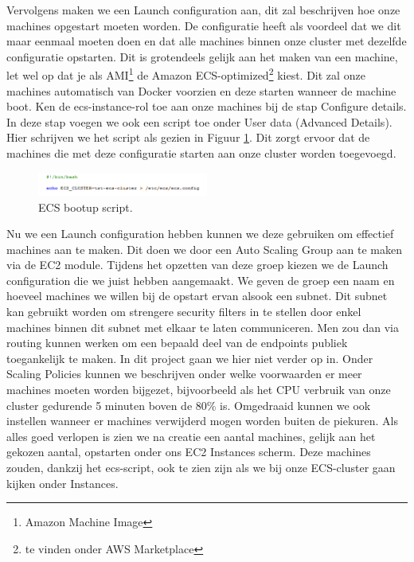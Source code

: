 \documentclass{article}
\begin{document}
	\par
	Vervolgens maken we een Launch configuration aan, dit zal beschrijven hoe onze machines opgestart moeten worden. De configuratie heeft als voordeel dat we dit maar eenmaal moeten doen en dat alle machines binnen onze cluster met dezelfde configuratie opstarten. Dit is grotendeels gelijk aan het maken van een machine, let wel op dat je als AMI\footnote{Amazon Machine Image} de Amazon ECS-optimized\footnote{te vinden onder AWS Marketplace} kiest. Dit zal onze machines automatisch van Docker voorzien en deze starten wanneer de machine boot. Ken de ecs-instance-rol toe aan onze machines bij de stap Configure details. In deze stap voegen we ook een script toe onder User data (Advanced Details). Hier schrijven we het script als gezien in Figuur \ref{fig:ecs-script}. Dit zorgt ervoor dat de machines die met deze configuratie starten aan onze cluster worden toegevoegd.
	\begin{figure}[h!]
		\centering
  		\includegraphics[width=0.5\textwidth]{images/ecs-script.PNG}
  		\caption{ECS bootup script.}
  		\label{fig:ecs-script}
	\end{figure}
	\par
	Nu we een Launch configuration hebben kunnen we deze gebruiken om effectief machines aan te maken. Dit doen we door een Auto Scaling Group aan te maken via de EC2 module. Tijdens het opzetten van deze groep kiezen we de Launch configuration die we juist hebben aangemaakt. We geven de groep een naam en hoeveel machines we willen bij de opstart ervan alsook een subnet. Dit subnet kan gebruikt worden om strengere security filters in te stellen door enkel machines binnen dit subnet met elkaar te laten communiceren. Men zou dan via routing kunnen werken om een bepaald deel van de endpoints publiek toegankelijk te maken. In dit project gaan we hier niet verder op in. Onder Scaling Policies kunnen we beschrijven onder welke voorwaarden er meer machines moeten worden bijgezet, bijvoorbeeld als het CPU verbruik van onze cluster gedurende 5 minuten boven de 80\% is. Omgedraaid kunnen we ook instellen wanneer er machines verwijderd mogen worden buiten de piekuren. Als alles goed verlopen is zien we na creatie een aantal machines, gelijk aan het gekozen aantal, opstarten onder ons EC2 Instances scherm. Deze machines zouden, dankzij het ecs-script, ook te zien zijn als we bij onze ECS-cluster gaan kijken onder Instances.
\end{document}
